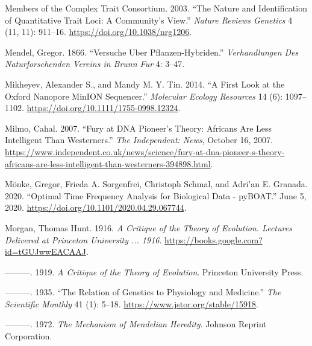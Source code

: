 \documentclass[
]{book}
\newlength{\cslhangindent}
\newlength{\cslentryspacingunit} %
\newenvironment{CSLReferences}[2] %
 {%
  \setlength{\parindent}{0pt}
  \ifodd #1
  \let\oldpar\par
  \def\par{\hangindent=\cslhangindent\oldpar}
  \fi
  \setlength{\parskip}{#2\cslentryspacingunit}
 }%
 {}
\begin{document}
\begin{CSLReferences}{1}{0}
\leavevmode{}%
Members of the Complex Trait Consortium. 2003. {``The Nature and Identification of Quantitative Trait Loci: A Community's View.''} \emph{Nature Reviews Genetics} 4 (11, 11): 911--16. \url{https://doi.org/10.1038/nrg1206}.

\leavevmode{}%
Mendel, Gregor. 1866. {``Versuche Uber Pflanzen-Hybriden.''} \emph{Verhandlungen Des Naturforschenden Vereins in Brunn Fur} 4: 3--47.

\leavevmode{}%
Mikheyev, Alexander S., and Mandy M. Y. Tin. 2014. {``A First Look at the {Oxford Nanopore MinION} Sequencer.''} \emph{Molecular Ecology Resources} 14 (6): 1097--1102. \url{https://doi.org/10.1111/1755-0998.12324}.

\leavevmode{}%
Milmo, Cahal. 2007. {``Fury at {DNA} Pioneer's Theory: {Africans} Are Less Intelligent Than {Westerners}.''} \emph{The Independent: News}, October 16, 2007. \url{https://www.independent.co.uk/news/science/fury-at-dna-pioneer-s-theory-africans-are-less-intelligent-than-westerners-394898.html}.

\leavevmode{}%
Mönke, Gregor, Frieda A. Sorgenfrei, Christoph Schmal, and Adri'an E. Granada. 2020. {``Optimal Time Frequency Analysis for Biological Data - {pyBOAT}.''} June 5, 2020. \url{https://doi.org/10.1101/2020.04.29.067744}.

\leavevmode{}%
Morgan, Thomas Hunt. 1916. \emph{A {Critique} of the {Theory} of {Evolution}. {Lectures Delivered} at {Princeton University} ... 1916}. \url{https://books.google.com?id=tGUJwwEACAAJ}.

\leavevmode{}%
---------. 1919. \emph{A {Critique} of the {Theory} of {Evolution}}. {Princeton University Press}.

\leavevmode{}%
---------. 1935. {``The {Relation} of {Genetics} to {Physiology} and {Medicine}.''} \emph{The Scientific Monthly} 41 (1): 5--18. \url{https://www.jstor.org/stable/15918}.

\leavevmode{}%
---------. 1972. \emph{The {Mechanism} of {Mendelian Heredity}}. {Johnson Reprint Corporation}.


\end{CSLReferences}
\end{document}
